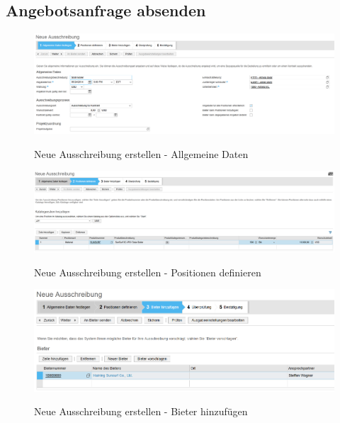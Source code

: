 \subsection{Angebotsanfrage absenden}
\label{sendrfq}

\begin{figure}[H]
	\begin{center}
	\includegraphics[width=1.0\textwidth]{grafiken/ByDesign-HowTo-Ausschreibung-1.png}
	\caption{Neue Ausschreibung erstellen - Allgemeine Daten}
	\vspace{-10pt}
	\label{abb:byd-newsupplier}
	\end{center}
\end{figure}

\begin{figure}[H]
	\begin{center}
	\includegraphics[width=1.0\textwidth]{grafiken/ByDesign-HowTo-Ausschreibung-2.png}
	\caption{Neue Ausschreibung erstellen - Positionen definieren}
	\vspace{-10pt}
	\label{abb:byd-newsupplier}
	\end{center}
\end{figure}

\begin{figure}[H]
	\begin{center}
	\includegraphics[width=1.0\textwidth]{grafiken/ByDesign-HowTo-Ausschreibung-3.png}
	\caption{Neue Ausschreibung erstellen - Bieter hinzufügen}
	\vspace{-10pt}
	\label{abb:byd-newsupplier}
	\end{center}
\end{figure}

